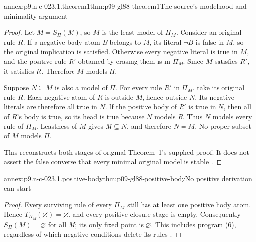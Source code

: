 \begin{annexitem}{annex:p9.n-c-023.1.theorem1}{thm:p09-gl88-theorem1}{The source's modelhood and minimality argument}
\begin{proof}
Let \(M=S_\Pi(M)\), so \(M\) is the least model of \(\Pi_M\).
Consider an original rule \(R\).  If a negative body atom \(B\) belongs
to \(M\), its literal \(\neg B\) is false in \(M\), so the original
implication is satisfied.  Otherwise every negative literal is true in
\(M\), and the positive rule \(R'\) obtained by erasing them is in
\(\Pi_M\).  Since \(M\) satisfies \(R'\), it satisfies \(R\).
Therefore \(M\) models \(\Pi\).

Suppose \(N\subseteq M\) is also a model of \(\Pi\).  For every rule
\(R'\) in \(\Pi_M\), take its original rule \(R\).  Each negative atom
of \(R\) is outside \(M\), hence outside \(N\).  Its negative literals
are therefore all true in \(N\).  If the positive body of \(R'\) is true
in \(N\), then all of \(R\)'s body is true, so its head is true because
\(N\) models \(R\).  Thus \(N\) models every rule of \(\Pi_M\).
Leastness of \(M\) gives \(M\subseteq N\), and therefore \(N=M\).
No proper subset of \(M\) models \(\Pi\).

This reconstructs both stages of original Theorem~1's supplied proof.  It
does not assert the false converse that every minimal original model is
stable \cite[\S2, Theorem~1 and proof, pp.~4--5]{GelfondLifschitz1988}.
\end{proof}
\end{annexitem}

\begin{annexitem}{annex:p9.n-c-023.1.positive-body}{thm:p09-gl88-positive-body}{No positive derivation can start}
\begin{proof}
Every surviving rule of every \(\Pi_M\) still has at least one positive
body atom.  Hence \(T_{\Pi_M}(\varnothing)=\varnothing\), and every
positive closure stage is empty.  Consequently
\(S_\Pi(M)=\varnothing\) for all \(M\); its only fixed point is
\(\varnothing\).  This includes program (6), regardless of which negative
conditions delete its rules \cite[\S3, pp.~6--7]{GelfondLifschitz1988}.
\end{proof}
\end{annexitem}

